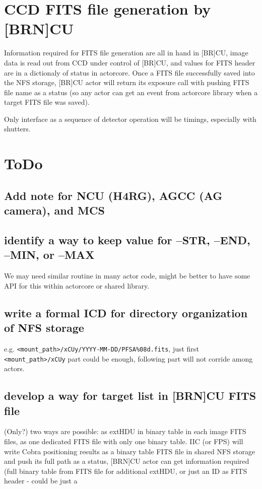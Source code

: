 \documentclass[a4paper,notitlepage]{article}
\begin{document}
\section{CCD FITS file generation by [BRN]CU}

Information required for FITS file generation are all in hand in [BR]CU, image
data is read out from CCD under control of [BR]CU, and values for FITS header are
in a dictionaly of status in actorcore. Once a FITS file successfully saved into
the NFS storage, [BR]CU actor will return its exposure call with pushing FITS
file name as a status (so any actor can get an event from actorcore library when
a target FITS file was saved).

Only interface as a sequence of detector operation will be timings, especially
with shutters.


\section{ToDo}

\subsection{Add note for NCU (H4RG), AGCC (AG camera), and MCS}

\subsection{identify a way to keep value for --STR, --END, --MIN, or --MAX}
  We may need similar routine in many actor code, might be better to have some API
for this within actorcore or shared library.

\subsection{write a formal ICD for directory organization of NFS storage}
  e.g. \verb|<mount_path>/xCUy/YYYY-MM-DD/PFSA%08d.fits|, just first \verb|<mount_path>/xCUy| part
could be enough, following part will not corride among actors.

\subsection{develop a way for target list in [BRN]CU FITS file}
  (Only?) two ways are possible: as extHDU in binary table in each image FITS files,
as one dedicated FITS file with only one binary table. IIC (or FPS) will write Cobra
positioning results as a binary table FITS file in shared NFS storage and push its
full path  as a status, [BRN]CU actor can get information required (full binary table
from FITS file for additional extHDU, or just an ID as FITS header - could be just
a %
\end{document}
